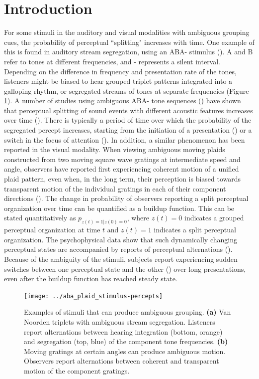 \documentclass{frontiersSCNS} %
\begin{document}
\section{Introduction}

For some stimuli in the auditory and visual modalities with ambiguous grouping cues, the probability of perceptual ``splitting" increases with time. One example of this is found in auditory stream segregation, using an ABA- stimulus (\cite{Noorden1975}). A and B refer to tones at different frequencies, and - represents a silent interval. Depending on the difference in frequency and presentation rate of the tones, listeners might be biased to hear grouped triplet patterns integrated into a galloping rhythm, or segregated streams of tones at separate frequencies (Figure \ref{fig:percepts_timecourse}). A number of studies using ambiguous ABA- tone sequences (\cite{Noorden1975}) have shown that perceptual splitting of sound events with different acoustic features increases over time (\cite{Bregman1978, Anstis1985,Cusack2004}). There is typically a period of time over which the probability of the segregated percept increases, starting from the initiation of a presentation (\cite{Bregman1978, Anstis1985}) or a switch in the focus of attention (\cite{Cusack2004}).  In addition, a similar phenomenon has been reported in the visual modality. When viewing ambiguous moving plaids constructed from two moving square wave gratings at intermediate speed and angle, observers have reported first experiencing coherent motion of a unified plaid pattern, even when, in the long term, their perception is biased towards transparent motion of the individual gratings in each of their component directions (\cite{Rubin2004}). The change in probability of observers reporting a split perceptual organization over time can be quantified as a buildup function. This can be stated quantitatively as $p_{z(t)=1|z(0)=0}$, where $z(t)=0$ indicates a grouped perceptual organization at time $t$ and $z(t)=1$ indicates a split perceptual organization. The psychophysical data show that such dynamically changing perceptual states are accompanied by reports of perceptual alternations (\cite{Deike2012}). %
Because of the ambiguity of the stimuli, subjects report experiencing sudden switches between one perceptual state and the other (\cite{Pressnitzer2006, Hupe2012}) over long presentations, even after the buildup function has reached steady state.

\begin{figure}
	\centering
	\texttt{[image: ../aba\_plaid\_stimulus-percepts]}
	\caption{Examples of stimuli that can produce ambiguous grouping. \textbf{(a)} Van Noorden triplets with ambiguous stream segregation. Listeners report alternations between hearing integration (bottom, orange) and segregation (top, blue) of the component tone frequencies. \textbf{(b)} Moving gratings at certain angles can produce ambiguous motion. Observers report alternations between coherent and transparent motion of the component gratings.}
	\label{fig:percepts_timecourse}
\end{figure}
\end{document}

